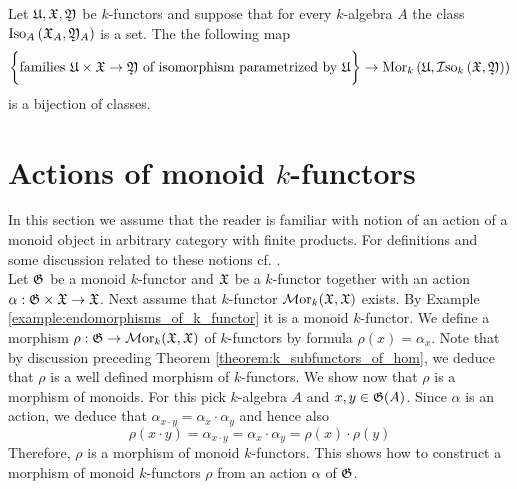 \begin{corollary}\label{corollary:hom_isomorphism_bijection}
Let ${\mathfrak U},{\mathfrak X},{\mathfrak Y}$ be $k$-functors and suppose that for every $k$-algebra $A$ the class $\mathrm{Iso}_A\left({\mathfrak X}_A,{\mathfrak Y}_A\right)$ is a set. The the following map
$$\bigg\{\mbox{families }{\mathfrak U}\times {\mathfrak X}\rightarrow {\mathfrak Y}\mbox{ of isomorphism parametrized by }{\mathfrak U}\bigg\}\rightarrow \mathrm{Mor}_k\left({\mathfrak U},\mathcal{I}\mathrm{so}_k\left({\mathfrak X},{\mathfrak Y}\right)\right)$$
is a bijection of classes.
\end{corollary}


\section{Actions of monoid $k$-functors}\label{section:actions_of_monoid_k_functors}
\noindent
In this section we assume that the reader is familiar with notion of an action of a monoid object in arbitrary category with finite products. For definitions and some discussion related to these notions cf. {\cite[pages 5]{Maclane}}.\\
Let ${\mathfrak G}$ be a monoid $k$-functor and ${\mathfrak X}$ be a $k$-functor together with an action $\alpha:{\mathfrak G}\times {\mathfrak X} \rightarrow {\mathfrak X}$. Next assume that $k$-functor $\mathcal{M}\mathrm{or}_k({\mathfrak X},{\mathfrak X})$ exists. By Example \ref{example:endomorphisms_of_k_functor} it is a monoid $k$-functor. We define a morphism $\rho:{\mathfrak G}\rightarrow \mathcal{M}\mathrm{or}_k({\mathfrak X},{\mathfrak X})$ of $k$-functors by formula $\rho(x) = \alpha_x$. Note that by discussion preceding Theorem \ref{theorem:k_subfunctors_of_hom}, we deduce that $\rho$ is a well defined morphism of $k$-functors. We show now that $\rho$ is a morphism of monoids. For this pick $k$-algebra $A$ and $x, y\in {\mathfrak G}(A)$. Since $\alpha$ is an action, we deduce that $\alpha_{x \cdot y} = \alpha_x \cdot \alpha_y$ and hence also
$$\rho(x\cdot y) = \alpha_{x \cdot y} = \alpha_x\cdot \alpha_y = \rho(x)\cdot \rho(y)$$
Therefore, $\rho$ is a morphism of monoid $k$-functors. This shows how to construct a morphism of monoid $k$-functors $\rho$ from an action $\alpha$ of ${\mathfrak G}$.

